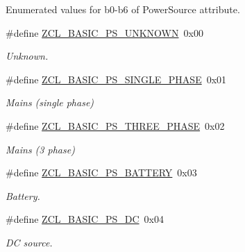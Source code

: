 Enumerated values for b0-\/b6 of Power\+Source attribute. \begin{DoxyCompactItemize}
\item 
\mbox{\label{group__zcl__basic_ga98e9e01925bb6c52e1d8ff837a32116d}} 
\#define \hyperlink{group__zcl__basic_ga98e9e01925bb6c52e1d8ff837a32116d}{Z\+C\+L\+\_\+\+B\+A\+S\+I\+C\+\_\+\+P\+S\+\_\+\+U\+N\+K\+N\+O\+WN}~0x00
\begin{DoxyCompactList}\small\item\em Unknown. \end{DoxyCompactList}\item 
\mbox{\label{group__zcl__basic_ga66eab175cd2834dbed155d4fa086e4d7}} 
\#define \hyperlink{group__zcl__basic_ga66eab175cd2834dbed155d4fa086e4d7}{Z\+C\+L\+\_\+\+B\+A\+S\+I\+C\+\_\+\+P\+S\+\_\+\+S\+I\+N\+G\+L\+E\+\_\+\+P\+H\+A\+SE}~0x01
\begin{DoxyCompactList}\small\item\em Mains (single phase) \end{DoxyCompactList}\item 
\mbox{\label{group__zcl__basic_gacd2c65021e4ac4544bfe2419697d2407}} 
\#define \hyperlink{group__zcl__basic_gacd2c65021e4ac4544bfe2419697d2407}{Z\+C\+L\+\_\+\+B\+A\+S\+I\+C\+\_\+\+P\+S\+\_\+\+T\+H\+R\+E\+E\+\_\+\+P\+H\+A\+SE}~0x02
\begin{DoxyCompactList}\small\item\em Mains (3 phase) \end{DoxyCompactList}\item 
\mbox{\label{group__zcl__basic_ga9002aa7599325d8b9ef74743dc77eb4e}} 
\#define \hyperlink{group__zcl__basic_ga9002aa7599325d8b9ef74743dc77eb4e}{Z\+C\+L\+\_\+\+B\+A\+S\+I\+C\+\_\+\+P\+S\+\_\+\+B\+A\+T\+T\+E\+RY}~0x03
\begin{DoxyCompactList}\small\item\em Battery. \end{DoxyCompactList}\item 
\mbox{\label{group__zcl__basic_ga528fdcef318ec276618896c7cbfec618}} 
\#define \hyperlink{group__zcl__basic_ga528fdcef318ec276618896c7cbfec618}{Z\+C\+L\+\_\+\+B\+A\+S\+I\+C\+\_\+\+P\+S\+\_\+\+DC}~0x04
\begin{DoxyCompactList}\small\item\em DC source. \end{DoxyCompactList}\item 

\end{DoxyCompactItemize}
